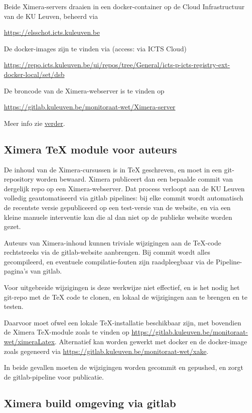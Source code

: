 \documentclass{ximera}
\begin{document}
Beide Ximera-servers draaien in een docker-container op de Cloud Infrastructuur van de KU Leuven, beheerd via

\url{https://elsschot.icts.kuleuven.be}

De docker-images zijn te vinden via (access: via ICTS Cloud)

\url{ https://repo.icts.kuleuven.be/ui/repos/tree/General/icts-p-icts-registry-ext-docker-local/set/dsb}


De broncode van de Ximera-webserver is te vinden op 

\url{https://gitlab.kuleuven.be/monitoraat-wet/Ximera-server}

Meer info zie \hyperref[sec:ximera-webserver]{verder}.

\subsection{Ximera TeX module voor auteurs}

De inhoud van de Ximera-cursussen is in TeX geschreven, en moet in een git-repository worden bewaard. Ximera publiceert dan een bepaalde commit van dergelijk repo op een Ximera-webserver. 
Dat process verloopt aan de KU Leuven volledig geautomatiseerd via gitlab pipelines: bij elke commit wordt automatisch de recentste versie gepubliceerd op een test-versie van de website, en via een kleine manuele interventie kan die al dan niet op de publieke website worden gezet.

Auteurs van Ximera-inhoud kunnen triviale wijzigingen aan de TeX-code rechtstreeks via de gitlab-website aanbrengen. Bij commit wordt alles gecompileerd, en eventuele compilatie-fouten zijn raadpleegbaar via de Pipeline-pagina's van gitlab.

Voor uitgebreide wijzigingen is deze werkwijze niet effectief, en is het nodig het git-repo met de TeX code te clonen, en lokaal de wijzigingen aan te brengen en te testen. 

Daarvoor moet ofwel een lokale TeX-installatie beschikbaar zijn, met bovendien de Ximera TeX-module zoals te vinden op \url{https://gitlab.kuleuven.be/monitoraat-wet/ximeraLatex}. Alternatief kan worden gewerkt met docker en de docker-image zoals gegeneerd via \url{https://gitlab.kuleuven.be/monitoraat-wet/xake}.

In beide gevallen moeten de wijzigingen worden gecommit en gepushed, en zorgt de gitlab-pipeline voor publicatie.

\subsection{Ximera build omgeving via gitlab}
\end{document}
